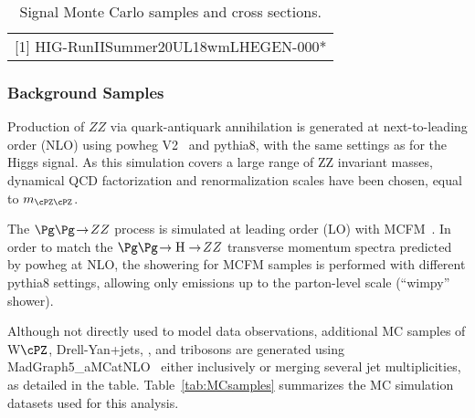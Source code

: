 \begin{table}
\begin{scriptsize}
\begin{tabular}{|l|l|r|}
 \hline
 \multicolumn{3}{l}{[1] HIG-RunIISummer20UL18wmLHEGEN-000*} \\  %
 \end{tabular}
 \caption{Signal Monte Carlo samples and cross sections.}
  \label{tab:SignalSamples}
\end{scriptsize}
\end{table}

\subsubsection{Background Samples}

Production of $ZZ$ via quark-antiquark annihilation is generated at
next-to-leading order (NLO) using {\sc powheg V2}~\cite{Nason:2013ydw}
and {\sc pythia8}, with 
the same settings as for the Higgs signal. As this simulation covers a large
range of ZZ invariant masses, dynamical QCD factorization and renormalization
scales have been chosen, equal to $m_{\cPZ\cPZ}$. 

The $\Pg\Pg \! \to \! ZZ$ process is simulated at leading order (LO) 
with MCFM~\cite{MCFM,Campbell:2013una}. In order to match the 
$\Pg\Pg \! \to \mathrm{H} \to \! ZZ$ transverse momentum spectra predicted 
by {\sc powheg} at NLO, the showering for MCFM samples is performed with 
different {\sc pythia8} settings, allowing only emissions up to the parton-level scale
(``wimpy'' shower).

Although not directly used to model data observations, additional 
MC samples of W$\cPZ$, Drell-Yan+jets, \ttbar, and tribosons are
generated using {\sc MadGraph5\_aMCatNLO}~\cite{Alwall:2014hca} either
inclusively or merging several jet multiplicities, as detailed in the table.
Table~\ref{tab:MCsamples} summarizes the MC simulation datasets used for this analysis. 


